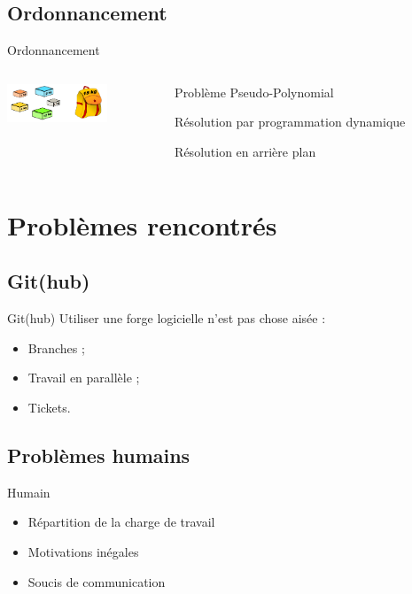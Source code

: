 \documentclass{beamer}
\begin{document}
	\subsection{Ordonnancement}
		\begin{frame}{Ordonnancement}
        \begin{columns}
            \begin{column}{0cm}
                \includegraphics[width=3cm]{images/knapsack.png}
            \end{column}
            \begin{column}{8cm}
                \begin{description}\itemsep15pt
                    \item Problème Pseudo-Polynomial
                    \item Résolution par programmation dynamique
                    \item Résolution en arrière plan
                \end{description}
            \end{column}
        \end{columns}
		\end{frame}

\section{Problèmes rencontrés}
\subsection{Git(hub)}
	\begin{frame}{Git(hub)}
	    Utiliser une forge logicielle n'est pas chose aisée :
		\begin{itemize}
		\setlength{\itemsep}{0.5cm}
			\item Branches ;
			\item Travail en parallèle ;
			\item Tickets.
		\end{itemize}
	\end{frame}
\subsection{Problèmes humains}
	\begin{frame}{Humain}
	    \begin{itemize}
		\setlength{\itemsep}{1cm}
	        \item Répartition de la charge de travail
	        \item Motivations inégales
	        \item Soucis de communication
        \end{itemize}
	\end{frame}
\end{document}
